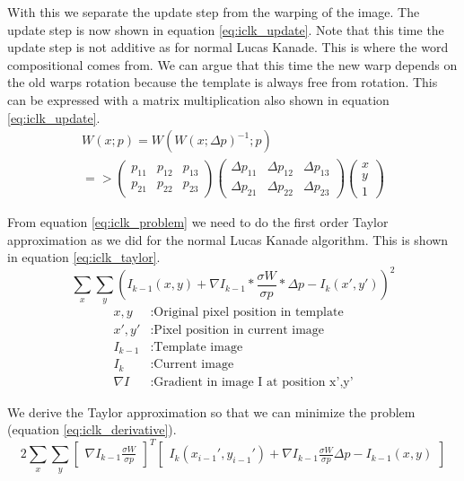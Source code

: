 \documentclass[11pt,a4paper,titlepage,oneside]{report}
\begin{document}
With this we separate the update step from the warping of the image. The update step is now shown in equation \ref{eq:iclk_update}. Note that this time the update step is not additive as for normal Lucas Kanade. This is where the word compositional comes from. We can argue that this time the new warp depends on the old warps rotation because the template is always free from rotation. This can be expressed with a matrix multiplication also shown in equation \ref{eq:iclk_update}.
\begin{equation}\label{eq:iclk_update}
	\begin{gathered}
		W(x;p)=W(W(x;\Delta p)^{-1}; p)\\
		=>
		\begin{pmatrix}
		p_{11} & p_{12} & p_{13} \\
		p_{21} & p_{22} & p_{23}
		\end{pmatrix}
		\begin{pmatrix}
			\Delta p_{11} & \Delta p_{12} & \Delta p_{13} \\
			\Delta p_{21} & \Delta p_{22} & \Delta p_{23}
		\end{pmatrix}
		\begin{pmatrix}
			x\\
			y\\
			1
		\end{pmatrix}
	\end{gathered}
\end{equation}

From equation \ref{eq:iclk_problem} we need to do the first order Taylor approximation as we did for the normal Lucas Kanade algorithm. This is shown in equation \ref{eq:iclk_taylor}.
\begin{equation}\label{eq:iclk_taylor}
	\sum_x\sum_y(I_{k-1}(x,y)+\nabla I_{k-1}*\frac{\sigma W}{\sigma p}*\Delta p-I_{k}(x',y'))^2
\end{equation}
\begin{align*}
	x,y				&:	\text{Original pixel position in template}\\
	x',y'			&:	\text{Pixel position in current image}\\
	I_{k-1}		&:	\text{Template image}\\
	I_{k}			&:	\text{Current image}\\
	\nabla I	&:	\text{Gradient in image I at position x',y'}
\end{align*}

We derive the Taylor approximation so that we can minimize the problem (equation \ref{eq:iclk_derivative}).
\begin{equation}\label{eq:iclk_derivative}
	2\sum_x\sum_y\begin{bmatrix}\nabla I_{k-1}\frac{\sigma W}{\sigma p}\end{bmatrix}^T\begin{bmatrix}I_{k}(x_{i-1}',y_{i-1}')+\nabla I_{k-1}\frac{\sigma W}{\sigma p}\Delta p-I_{k-1}(x,y)\end{bmatrix}
\end{equation}
\end{document}
